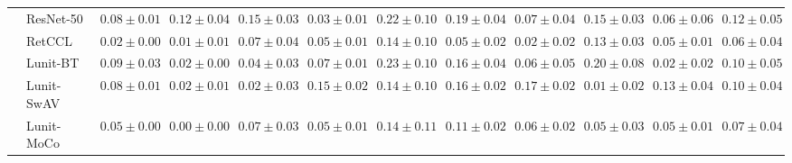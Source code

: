 \begin{tabular}{ll|cccc|c|cccc|c}
 & ResNet-50 & $0.08 \pm 0.01$ & $0.12 \pm 0.04$ & $0.15 \pm 0.03$ & $0.03 \pm 0.01$ & $0.22 \pm 0.10$ & $0.19 \pm 0.04$ & $0.07 \pm 0.04$ & $0.15 \pm 0.03$ & $0.06 \pm 0.06$ & $0.12 \pm 0.05$ \\
 & RetCCL & $0.02 \pm 0.00$ & $0.01 \pm 0.01$ & $0.07 \pm 0.04$ & $0.05 \pm 0.01$ & $0.14 \pm 0.10$ & $0.05 \pm 0.02$ & $0.02 \pm 0.02$ & $0.13 \pm 0.03$ & $0.05 \pm 0.01$ & $0.06 \pm 0.04$ \\
 & Lunit-BT & $0.09 \pm 0.03$ & $0.02 \pm 0.00$ & $0.04 \pm 0.03$ & $0.07 \pm 0.01$ & $0.23 \pm 0.10$ & $0.16 \pm 0.04$ & $0.06 \pm 0.05$ & $0.20 \pm 0.08$ & $0.02 \pm 0.02$ & $0.10 \pm 0.05$ \\
 & Lunit-SwAV & $0.08 \pm 0.01$ & $0.02 \pm 0.01$ & $\mathbf{0.02 \pm 0.03}$ & $0.15 \pm 0.02$ & $0.14 \pm 0.10$ & $0.16 \pm 0.02$ & $0.17 \pm 0.02$ & $\mathbf{0.01 \pm 0.02}$ & $0.13 \pm 0.04$ & $0.10 \pm 0.04$ \\
 & Lunit-MoCo & $0.05 \pm 0.00$ & $\mathbf{0.00 \pm 0.00}$ & $0.07 \pm 0.03$ & $0.05 \pm 0.01$ & $0.14 \pm 0.11$ & $0.11 \pm 0.02$ & $0.06 \pm 0.02$ & $0.05 \pm 0.03$ & $0.05 \pm 0.01$ & $0.07 \pm 0.04$ \\
\cline{1-12}
\bottomrule
\end{tabular}
